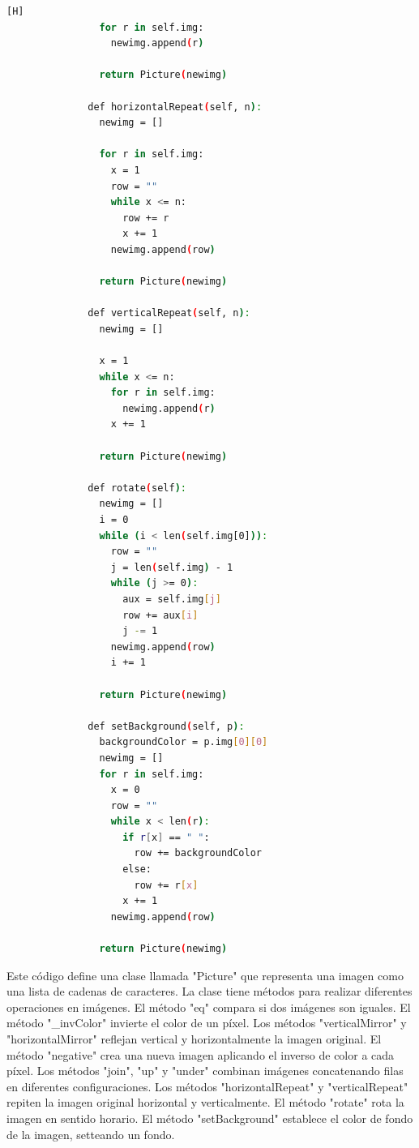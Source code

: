 \documentclass{article}
\begin{document}
\begin{lstlisting}[language=bash,caption={Métodos de la clase Picture para manipulación de imágenes}][H]
                for r in self.img:
                  newimg.append(r)
            
                return Picture(newimg)
            
              def horizontalRepeat(self, n):
                newimg = []
            
                for r in self.img:
                  x = 1
                  row = ""
                  while x <= n:
                    row += r
                    x += 1
                  newimg.append(row)
            
                return Picture(newimg)
            
              def verticalRepeat(self, n):
                newimg = []
            
                x = 1
                while x <= n:
                  for r in self.img:
                    newimg.append(r)
                  x += 1
            
                return Picture(newimg)
            
              def rotate(self):
                newimg = []
                i = 0
                while (i < len(self.img[0])):
                  row = ""
                  j = len(self.img) - 1
                  while (j >= 0):
                    aux = self.img[j]
                    row += aux[i]
                    j -= 1
                  newimg.append(row)
                  i += 1
            
                return Picture(newimg)
            
              def setBackground(self, p):
                backgroundColor = p.img[0][0]
                newimg = []
                for r in self.img:
                  x = 0
                  row = ""
                  while x < len(r):
                    if r[x] == " ":
                      row += backgroundColor
                    else:
                      row += r[x]
                    x += 1
                  newimg.append(row)
            
                return Picture(newimg)
	\end{lstlisting}
Este código define una clase llamada "Picture" que representa una imagen como una lista de cadenas de caracteres. La clase tiene métodos para realizar diferentes operaciones en imágenes. El método "eq" compara si dos imágenes son iguales. El método "\_invColor" invierte el color de un píxel. Los métodos "verticalMirror" y "horizontalMirror" reflejan vertical y horizontalmente la imagen original. El método "negative" crea una nueva imagen aplicando el inverso de color a cada píxel. Los métodos "join", "up" y "under" combinan imágenes concatenando filas en diferentes configuraciones. Los métodos "horizontalRepeat" y "verticalRepeat" repiten la imagen original horizontal y verticalmente. El método "rotate" rota la imagen en sentido horario. El método "setBackground" establece el color de fondo de la imagen, setteando un fondo.
\end{document}
